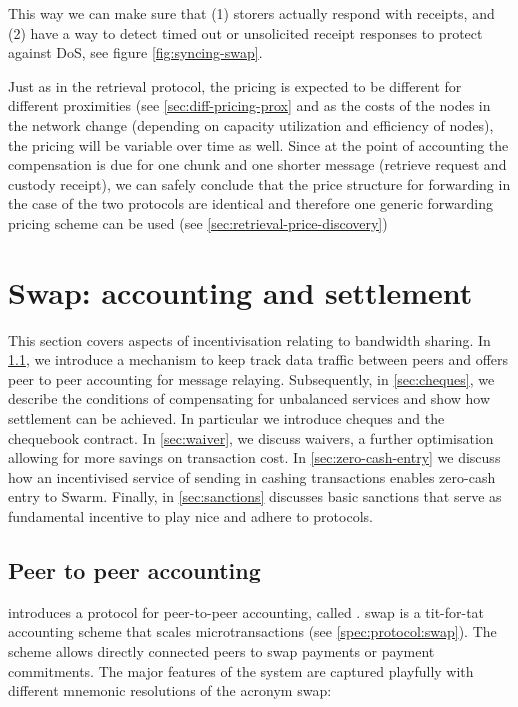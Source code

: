 This way we can make sure that (1) storers actually respond with receipts, and (2) have a way to detect timed out or unsolicited receipt responses to protect against DoS, see figure \ref{fig:syncing-swap}.

Just as in the retrieval protocol, the pricing is expected to be different for different proximities (see \ref{sec:diff-pricing-prox} and as the costs of the nodes in the network change (depending on capacity utilization and efficiency of nodes), the pricing will be variable over time as well. Since at the point of accounting the compensation is due for one chunk and one shorter message (retrieve request and custody receipt), we can safely conclude that the price structure for forwarding in the case of the two protocols are identical and therefore one generic forwarding pricing scheme can be used (see  \ref{sec:retrieval-price-discovery}) 
 

\section{Swap: accounting and settlement}\label{sec:accounting-and-settlement}

\green{}

This section covers aspects of incentivisation relating to bandwidth sharing. 
In \ref{sec:accounting}, we introduce a mechanism  to keep track data traffic between  peers and offers peer to peer accounting for message relaying.
Subsequently, in  \ref{sec:cheques}, we describe the conditions of compensating for unbalanced services and show how settlement can be achieved.
In particular we introduce cheques and the chequebook contract. In \ref{sec:waiver}, we discuss waivers, a further optimisation allowing for more savings on transaction cost. In \ref{sec:zero-cash-entry} we discuss how an incentivised service of sending in cashing transactions enables zero-cash entry to Swarm.
Finally, in \ref{sec:sanctions} discusses basic sanctions that serve as fundamental incentive to play nice and adhere to protocols.

\subsection{Peer to peer accounting}\label{sec:accounting}


\cite{ethersphere2016sw3} introduces a protocol for peer-to-peer accounting, called . swap is a tit-for-tat accounting scheme that scales microtransactions (see \ref{spec:protocol:swap}). The scheme allows directly connected peers to swap payments or payment commitments. The major features of the system are captured playfully with different mnemonic resolutions of the acronym swap:

